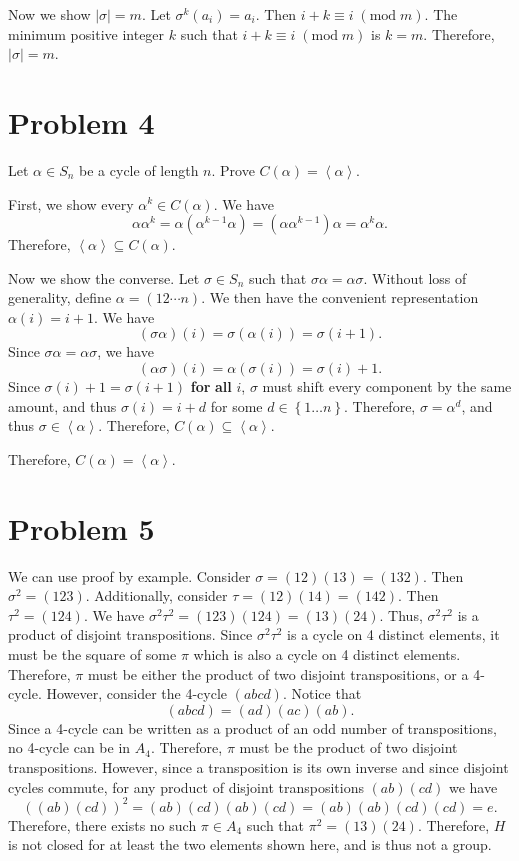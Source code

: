 \documentclass[11pt, letterpaper]{report}
\renewcommand{\mod}[1]{\;(\text{mod}\;#1)}
\begin{document}
Now we show $\left| \sigma  \right| =m$. Let $\sigma ^k (a_i)=a_i$. Then $i+k\equiv i\mod{m}$. The minimum positive integer $k$ such that $i+k\equiv i\mod{m}$ is $k=m$. Therefore, $\left| \sigma  \right| =m$.
\section*{Problem 4}
Let $\alpha \in S_n$ be a cycle of length $n$. Prove $C(\alpha )=\left<\alpha  \right>$.

First, we show every $\alpha ^k\in C(\alpha )$. We have
\[
	\alpha \alpha ^k = \alpha \left( \alpha ^{k-1}\alpha  \right) =\left( \alpha \alpha ^{k-1} \right) \alpha =\alpha ^k\alpha 
.\]
Therefore, $\left<\alpha  \right>\subseteq C(\alpha )$.

Now we show the converse. Let $\sigma \in S_n$ such that $\sigma \alpha =\alpha \sigma $. Without loss of generality, define $\alpha =(12\cdots n)$. We then have the convenient representation $\alpha (i)=i+1$. We have
\[
	(\sigma \alpha )(i)=\sigma (\alpha (i))=\sigma (i+1)
.\]
Since $\sigma \alpha =\alpha \sigma $, we have
\[
	(\alpha \sigma )(i)=\alpha (\sigma (i))=\sigma (i)+1
.\]
Since $\sigma (i)+1=\sigma (i+1)$ \textbf{for} \textbf{all} $i$, $\sigma $ must shift every component by the same amount, and thus $\sigma (i)=i+d$ for some $d\in \left\{ 1\ldots n \right\} $. Therefore, $\sigma =\alpha ^d$, and thus $\sigma \in \left<\alpha  \right>$. Therefore, $C(\alpha )\subseteq \left<\alpha  \right>$.

Therefore, $C(\alpha )=\left<\alpha  \right>$.


\section*{Problem 5}
We can use proof by example. Consider $\sigma =\left( 12 \right)(13)=(132) $. Then $\sigma ^2=\left( 123 \right) $. Additionally, consider $\tau =(12)(14)=(142)$. Then $\tau ^2=(124)$. We have $\sigma ^2 \tau ^2= (123)(124)=(13)(24)$. Thus, $\sigma ^2\tau ^2$ is a product of disjoint transpositions. Since $\sigma ^2\tau ^2$ is a cycle on 4 distinct elements, it must be the square of some $\pi $ which is also a cycle on 4 distinct elements. Therefore, $\pi $ must be either the product of two disjoint transpositions, or a 4-cycle. However, consider the 4-cycle $(abcd)$. Notice that
\[
	(abcd)=(ad)(ac)(ab)
.\]
Since a 4-cycle can be written as a product of an odd number of transpositions, no 4-cycle can be in $A_4$. Therefore, $\pi $ must be the product of two disjoint transpositions. However, since a transposition is its own inverse and since disjoint cycles commute, for any product of disjoint transpositions $(ab)(cd)$ we have
\[
	((ab)(cd))^2=(ab)(cd)(ab)(cd)=(ab)(ab)(cd)(cd)=e
.\]
Therefore, there exists no such $\pi \in A_4$ such that $\pi ^2 = (13)(24)$. Therefore, $H$ is not closed for at least the two elements shown here, and is thus not a group.
\end{document}
